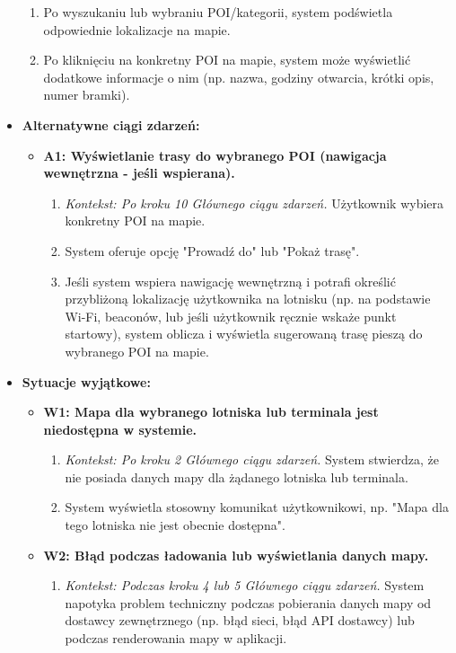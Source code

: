 \documentclass[a4paper,12pt]{article}
\begin{document}
\begin{itemize}
\begin{enumerate}
            \item Po wyszukaniu lub wybraniu POI/kategorii, system podświetla odpowiednie lokalizacje na mapie.
            \item Po kliknięciu na konkretny POI na mapie, system może wyświetlić dodatkowe informacje o nim (np. nazwa, godziny otwarcia, krótki opis, numer bramki).
        \end{enumerate}
    \item \textbf{Alternatywne ciągi zdarzeń:}
        \begin{itemize}
            \item \textbf{A1: Wyświetlanie trasy do wybranego POI (nawigacja wewnętrzna - jeśli wspierana).}
                \begin{enumerate}
                    \item \textit{Kontekst: Po kroku 10 Głównego ciągu zdarzeń.} Użytkownik wybiera konkretny POI na mapie.
                    \item System oferuje opcję "Prowadź do" lub "Pokaż trasę".
                    \item Jeśli system wspiera nawigację wewnętrzną i potrafi określić przybliżoną lokalizację użytkownika na lotnisku (np. na podstawie Wi-Fi, beaconów, lub jeśli użytkownik ręcznie wskaże punkt startowy), system oblicza i wyświetla sugerowaną trasę pieszą do wybranego POI na mapie.
                \end{enumerate}
        \end{itemize}
    \item \textbf{Sytuacje wyjątkowe:}
        \begin{itemize}
            \item \textbf{W1: Mapa dla wybranego lotniska lub terminala jest niedostępna w systemie.}
                \begin{enumerate}
                    \item \textit{Kontekst: Po kroku 2 Głównego ciągu zdarzeń.} System stwierdza, że nie posiada danych mapy dla żądanego lotniska lub terminala.
                    \item System wyświetla stosowny komunikat użytkownikowi, np. "Mapa dla tego lotniska nie jest obecnie dostępna".
                \end{enumerate}
            \item \textbf{W2: Błąd podczas ładowania lub wyświetlania danych mapy.}
                \begin{enumerate}
                    \item \textit{Kontekst: Podczas kroku 4 lub 5 Głównego ciągu zdarzeń.} System napotyka problem techniczny podczas pobierania danych mapy od dostawcy zewnętrznego (np. błąd sieci, błąd API dostawcy) lub podczas renderowania mapy w aplikacji.

\end{enumerate}
\end{itemize}
\end{itemize}
\end{document}
